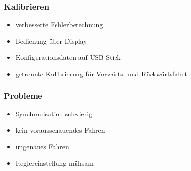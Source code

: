 \begin{frame}
	\frametitle{Kalibrieren}
	\begin{itemize}
		\item verbesserte Fehlerberechnung
		\item Bedienung über Display
		\item Konfigurationsdaten auf USB-Stick
		\item getrennte Kalibrierung für Vorwärts- und Rückwärtsfahrt
	\end{itemize}
\end{frame}

\begin{frame}
	\frametitle{Probleme}
	\begin{itemize}
		\item Synchronisation schwierig
		\item kein vorausschauendes Fahren
		\item ungenaues Fahren
		\item Reglereinstellung mühsam
	\end{itemize}
\end{frame}